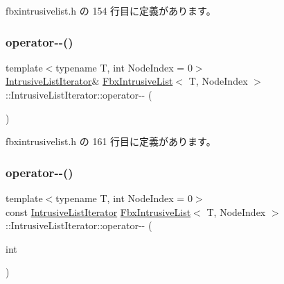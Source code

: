  fbxintrusivelist.\+h の 154 行目に定義があります。

\mbox{\label{class_fbx_intrusive_list_1_1_intrusive_list_iterator_a4e2124e583c78c84dfe33edbdc44212d}} 
\subsubsection{\texorpdfstring{operator-\/-\/()}{operator--()}\hspace{0.1cm}{\footnotesize\ttfamily [1/2]}}
{\footnotesize\ttfamily template$<$typename T, int Node\+Index = 0$>$ \\
\hyperlink{class_fbx_intrusive_list_1_1_intrusive_list_iterator}{Intrusive\+List\+Iterator}\& \hyperlink{class_fbx_intrusive_list}{Fbx\+Intrusive\+List}$<$ T, Node\+Index $>$\+::Intrusive\+List\+Iterator\+::operator-\/-\/ (\begin{DoxyParamCaption}{ }\end{DoxyParamCaption})\hspace{0.3cm}{\ttfamily [inline]}}



 fbxintrusivelist.\+h の 161 行目に定義があります。

\mbox{\label{class_fbx_intrusive_list_1_1_intrusive_list_iterator_a7afb5eb0843b79c64a8fbe87b604a651}} 
\subsubsection{\texorpdfstring{operator-\/-\/()}{operator--()}\hspace{0.1cm}{\footnotesize\ttfamily [2/2]}}
{\footnotesize\ttfamily template$<$typename T, int Node\+Index = 0$>$ \\
const \hyperlink{class_fbx_intrusive_list_1_1_intrusive_list_iterator}{Intrusive\+List\+Iterator} \hyperlink{class_fbx_intrusive_list}{Fbx\+Intrusive\+List}$<$ T, Node\+Index $>$\+::Intrusive\+List\+Iterator\+::operator-\/-\/ (\begin{DoxyParamCaption}\item[{int}]{ }\end{DoxyParamCaption})\hspace{0.3cm}{\ttfamily [inline]}}



